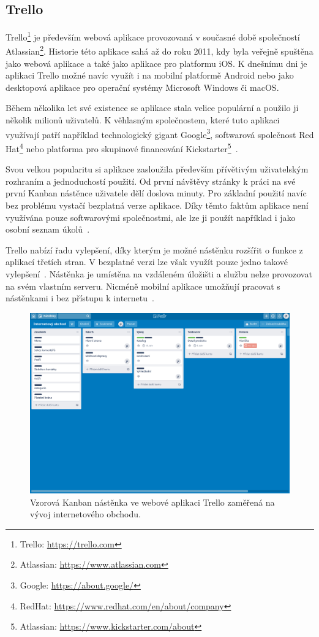 \subsection{Trello}
Trello\footnote{Trello: \url{https://trello.com}} je především webová aplikace provozovaná v současné době společností Atlassian\footnote{Atlassian: \url{https://www.atlassian.com}}. Historie této aplikace sahá až do roku 2011, kdy byla veřejně spuštěna jako webová aplikace a také jako aplikace pro platformu iOS. K dnešnímu dni je aplikaci Trello možné navíc využít i na mobilní platformě Android nebo jako desktopová aplikace pro operační systémy Microsoft Windows či macOS. 

Během několika let své existence se aplikace stala velice populární a použilo ji několik milionů uživatelů. K věhlasným společnostem, které tuto aplikaci využívají patří například technologický gigant Google\footnote{Google: \url{https://about.google/}}, softwarová společnost Red Hat\footnote{RedHat: \url{https://www.redhat.com/en/about/company}} nebo platforma pro skupinové financování Kickstarter\footnote{Atlassian: \url{https://www.kickstarter.com/about}}~\cite{bib:trello-about}. 

Svou velkou popularitu si aplikace zasloužila především přívětivým uživatelským rozhraním a jednoduchostí použití. Od první návštěvy stránky k práci na své první Kanban nástěnce uživatele dělí doslova minuty. Pro základní použití navíc bez problému vystačí bezplatná verze aplikace. Díky těmto faktům aplikace není využívána pouze softwarovými společnostmi, ale lze ji použít například i jako osobní seznam úkolů~\cite{bib:jira-vs-trello}.

Trello nabízí řadu vylepšení, díky kterým je možné nástěnku rozšířit o funkce z aplikací třetích stran. 
V bezplatné verzi lze však využít pouze jedno takové vylepšení~\cite{bib:trello-pricing}.
Nástěnka je umístěna na vzdáleném úložišti a službu nelze provozovat na svém vlastním serveru. Nicméně mobilní aplikace umožňují pracovat s nástěnkami i bez přístupu k internetu~\cite{bib:trello-common}.

\begin{figure}[H]
	\centering
	\includegraphics[width=\textwidth]{obrazky-figures/trello.png}
	\caption{Vzorová Kanban nástěnka ve webové aplikaci Trello zaměřená na vývoj internetového obchodu.}
\end{figure}

